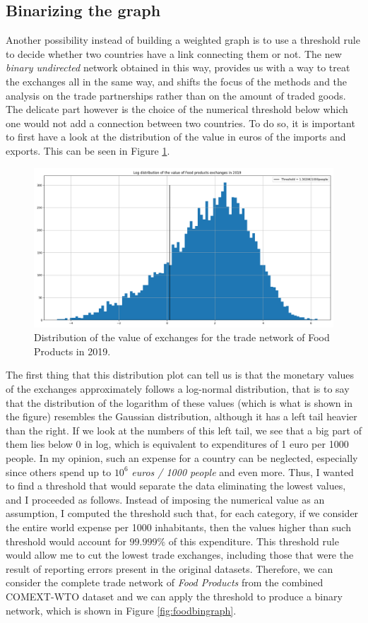 \subsection{Binarizing the graph}
Another possibility instead of building a weighted graph is to use a threshold rule to decide whether two countries have a link connecting them or not. The new \textit{binary undirected} network obtained in this way, provides us with a way to treat the exchanges all in the same way, and shifts the focus of the methods and the analysis on the trade partnerships rather than on the amount of traded goods. The delicate part however is the choice of the numerical threshold below which one would not add a connection between two countries. To do so, it is important to first have a look at the distribution of the value in euros of the imports and exports. This can be seen in Figure \ref{fig:distrfood19}. 
\begin{figure}
    \centering
    \includegraphics[width=\textwidth]{pics/thresh_complete_y19_p10.png}
    \caption{Distribution of the value of exchanges for the trade network of Food Products in 2019.}
    \label{fig:distrfood19}
\end{figure}
The first thing that this distribution plot can tell us is that the monetary values of the exchanges approximately follows a log-normal distribution, that is to say that the distribution of the logarithm of these values (which is what is shown in the figure) resembles the Gaussian distribution, although it has a left tail heavier than the right. If we look at the numbers of this left tail, we see that a big part of them lies below 0 in log, which is equivalent to expenditures of 1 euro per 1000 people.
In my opinion, such an expense for a country can be neglected, especially since others spend up to $10^6$ \textit{euros / 1000 people} and even more. Thus, I wanted to find a threshold that would separate the data eliminating the lowest values, and I proceeded as follows. Instead of imposing the numerical value as an assumption, I computed the threshold such that, for each category, if we consider the entire world expense per 1000 inhabitants, then the values higher than such threshold would account for $99.999\%$ of this expenditure. This threshold rule would allow me to cut the lowest trade exchanges, including those that were the result of reporting errors present in the original datasets. Therefore, we can consider the complete trade network of \textit{Food Products} from the combined COMEXT-WTO dataset and we can apply the threshold to produce a binary network, which is shown in Figure \ref{fig:foodbingraph}.

